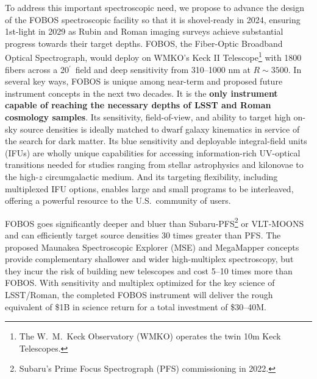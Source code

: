 \documentclass[oneside,11pt]{amsart}
\newcommand{\arcmin}{\mbox{$^{\prime}$}}
\DeclareRobustCommand{\gtrsim}{%
\mathrel{\hskip-.5em\begin{array}{c}>\\[-8pt]\sim\end{array}\hskip-.5em}}
\begin{document}

To address this important spectroscopic need, we propose to advance the design of the FOBOS spectroscopic facility so that it is shovel-ready in 2024, ensuring 1st-light in 2029 as Rubin and Roman imaging surveys achieve substantial progress towards their target depths.  FOBOS, the Fiber-Optic Broadband Optical Spectrograph, would deploy on WMKO's Keck II Telescope\footnote{The W.~M.\ Keck Observatory (WMKO) operates the twin 10m Keck Telescopes.} with 1800 fibers across a 20\arcmin\ field and deep sensitivity from 310--1000 nm at $R \sim 3500$.  In several key ways, FOBOS is unique among near-term and proposed future instrument concepts in the next two decades\citep{bundy19}.  It is the \textbf{only instrument capable of reaching the necessary depths of LSST and Roman cosmology samples}.  Its sensitivity, field-of-view, and ability to target high on-sky source densities is ideally matched to dwarf galaxy kinematics in service of the search for dark matter.  Its blue sensitivity and deployable integral-field units (IFUs) are wholly unique capabilities for accessing information-rich UV-optical transitions needed for studies ranging from stellar astrophysics and kilonovae to the high-$z$ circumgalactic medium.  And its targeting flexibility, including multiplexed IFU options, enables large and small programs to be interleaved, offering a powerful resource to the U.S.\ community of users.

FOBOS goes significantly deeper and bluer than Subaru-PFS\footnote{Subaru's Prime Focus Spectrograph (PFS) commissioning in 2022.} or VLT-MOONS and can efficiently target source densities 30 times greater than PFS.  The proposed Maunakea Spectroscopic Explorer (MSE) and MegaMapper concepts provide complementary shallower and wider high-multiplex spectroscopy, but they incur the risk of building new telescopes and cost 5--10 times more than FOBOS.  With sensitivity and multiplex optimized for the key science of LSST/Roman, the completed FOBOS instrument will deliver the rough equivalent of \$1B in science return for a total investment of \$30--40M.




\end{document}
